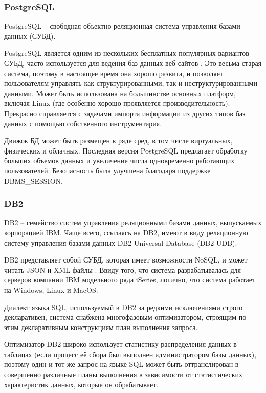 \documentclass[a4paper,14pt]{extreport}
\begin{document}
\subsubsection*{PostgreSQL}

PostgreSQL \cite{pg} -- свободная объектно-реляционная система управления базами данных (СУБД).

PostgreSQL является одним из нескольких бесплатных популярных вариантов СУБД, часто используется для ведения баз данных веб-сайтов \cite{cmp_db}. Это весьма старая система, поэтому в настоящее время она хорошо развита, и позволяет пользователям управлять как структурированными, так и неструктурированными данными. Может быть использована на большинстве основных платформ, включая Linux (где особенно хорошо проявляется производительность). Прекрасно справляется с задачами импорта информации из других типов баз данных с помощью собственного инструментария.

Движок БД может быть размещен в ряде сред, в том числе виртуальных, физических и облачных. Последняя версия PostgreSQL предлагает обработку больших объемов данных и увеличение числа одновременно работающих пользователей. Безопасность была улучшена благодаря поддержке DBMS\_SESSION.

\subsubsection*{DB2}

DB2 \cite{db2} -- семейство систем управления реляционными базами данных, выпускаемых корпорацией IBM. Чаще всего, ссылаясь на DB2, имеют в виду реляционную систему управления базами данных DB2 Universal Database (DB2 UDB).

DB2 представляет собой СУБД, которая имеет возможности NoSQL, и может читать JSON и XML-файлы  \cite{cmp_db}. Ввиду того, что система разрабатывалась для серверов компании IBM модельного ряда iSeries, логично, что система работает на Windows, Linux и MacOS.

Диалект языка SQL, используемый в DB2 за редкими исключениями строго декларативен, система снабжена многофазовым оптимизатором, строящим по этим декларативным конструкциям план выполнения запроса.

Оптимизатор DB2 широко использует статистику распределения данных в таблицах (если процесс её сбора был выполнен администратором базы данных), поэтому один и тот же запрос на языке SQL может быть оттранслирован в совершенно различные планы выполнения в зависимости от статистических характеристик данных, которые он обрабатывает.
\end{document}
